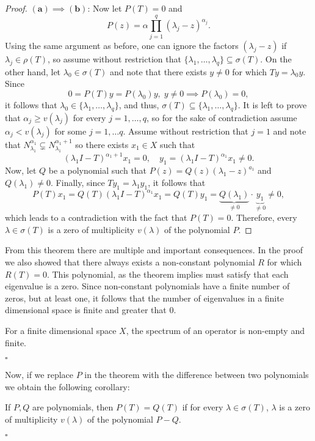 \begin{proof}
    $\boldsymbol{(a) \implies (b)}$: Now let $P(T) = 0$ and
    \[ P(z) = \alpha \prod_{j = 1}^{q} (\lambda_j - z)^{\alpha_j}.  \]
    Using the same argument as before, one can ignore the factors $(\lambda_j - z)$ if $\lambda_j \in \rho(T)$, so assume without restriction that $\{\lambda_1,\ldots, \lambda_q\} \subseteq \sigma(T)$. On the other hand, let $\lambda_0 \in \sigma(T)$ and note that there exists $y \neq 0$ for which $T y = \lambda_0 y$. Since
    \[  0 = P(T) y = P(\lambda_0) y,\; y\neq 0 \implies P(\lambda_0) = 0, \]
    it follows that $\lambda_0 \in \{\lambda_1,\ldots, \lambda_q\}$, and thus, $\sigma(T) \subseteq \{\lambda_1,\ldots, \lambda_q\}$. It is left to prove that $\alpha_j \geq v(\lambda_j)$ for every $j = 1,\ldots, q$, so for the sake of contradiction assume $\alpha_j < v(\lambda_j)$ for some $j = 1,\ldots q$. Assume without restriction that $j = 1$ and note that $N_{\lambda_1}^{\alpha_1} \subsetneq N_{\lambda_1}^{\alpha_1 + 1}$ so there exists $x_1 \in X$ such that
    \[ (\lambda_1 I - T)^{\alpha_1 + 1}x_1 = 0,\quad y_1 = (\lambda_1 I - T)^{\alpha_1}x_1 \neq 0.  \]
    Now, let $Q$ be a polynomial such that $P(z) = Q(z)(\lambda_1 - z)^{a_1} $ and $Q(\lambda_1) \neq 0$. Finally, since $T y_1 = \lambda_1 y_1$, it follows that
    \[ P(T)x_1 =  Q(T)(\lambda_1 I - T)^{\alpha_1}x_1 = Q(T) y_1 = \underbrace{Q(\lambda_1)}_{\neq 0} \cdot \underbrace{y_1}_{\neq 0} \neq 0, \]
    which leads to a contradiction with the fact that $P(T) = 0$. Therefore, every $\lambda\in \sigma(T)$ is a zero of multiplicity $v(\lambda)$ of the polynomial $P$.
\end{proof}

From this theorem there are multiple and important consequences. In the proof we also showed that there always exists a non-constant polynomial $R$ for which $R(T) = 0$. This polynomial, as the theorem implies must satisfy that each eigenvalue is a zero. Since non-constant polynomials have a finite number of zeros, but at least one, it follows that the number of eigenvalues in a finite dimensional space is finite and greater that 0.

\begin{corollary}
    For a finite dimensional space $X$, the spectrum of an operator is non-empty and finite.
\end{corollary}
$ $\hfill $\square$

Now, if we replace $P$ in the theorem with the difference between two polynomials we obtain the following corollary:

\begin{corollary}
    If $P, Q$ are polynomials, then $P(T) = Q(T)$ if for every $\lambda \in \sigma(T)$, $\lambda$ is a zero of multiplicity $v(\lambda)$ of the polynomial $P-Q$.
\end{corollary}
$ $\hfill $\square$

